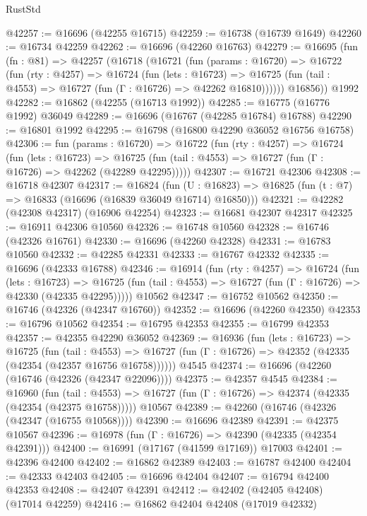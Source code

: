 \begin{lexlean}{RustStd}
\begin{coremodule}
@42257 := @16696 (@42255 @16715)
@42259 := @16738 (@16739 @1649)
@42260 := @16734 @42259
@42262 := @16696 (@42260 @16763)
@42279 := @16695
    (fun (fn : @81) =>
    @42257
      (@16718
        (@16721
          (fun (params : @16720) =>
          @16722
            (fun (rty : @4257) =>
            @16724
              (fun (lets : @16723) =>
              @16725 (fun (tail : @4553) => @16727 (fun (Γ : @16726) => @42262 @16810))))))
        @16856))
    @1992
@42282 := @16862 (@42255 (@16713 @1992))
@42285 := @16775 (@16776 @1992) @36049
@42289 := @16696 (@16767 (@42285 @16784) @16788)
@42290 := @16801 @1992
@42295 := @16798 (@16800 @42290 @36052 @16756 @16758)
@42306 := fun (params : @16720) =>
  @16722
    (fun (rty : @4257) =>
    @16724
      (fun (lets : @16723) =>
      @16725 (fun (tail : @4553) => @16727 (fun (Γ : @16726) => @42262 (@42289 @42295)))))
@42307 := @16721 @42306
@42308 := @16718 @42307
@42317 := @16824
    (fun (U : @16823) => @16825 (fun (t : @7) => @16833 (@16696 (@16839 @36049 @16714) @16850)))
@42321 := @42282 (@42308 @42317) (@16906 @42254)
@42323 := @16681 @42307 @42317
@42325 := @16911 @42306 @10560
@42326 := @16748 @10560
@42328 := @16746 (@42326 @16761)
@42330 := @16696 (@42260 @42328)
@42331 := @16783 @10560
@42332 := @42285 @42331
@42333 := @16767 @42332
@42335 := @16696 (@42333 @16788)
@42346 := @16914
    (fun (rty : @4257) =>
    @16724
      (fun (lets : @16723) =>
      @16725 (fun (tail : @4553) => @16727 (fun (Γ : @16726) => @42330 (@42335 @42295)))))
    @10562
@42347 := @16752 @10562
@42350 := @16746 (@42326 (@42347 @16760))
@42352 := @16696 (@42260 @42350)
@42353 := @16796 @10562
@42354 := @16795 @42353
@42355 := @16799 @42353
@42357 := @42355 @42290 @36052
@42369 := @16936
    (fun (lets : @16723) =>
    @16725
      (fun (tail : @4553) =>
      @16727 (fun (Γ : @16726) => @42352 (@42335 (@42354 (@42357 @16756 @16758))))))
    @4545
@42374 := @16696 (@42260 (@16746 (@42326 (@42347 @22096))))
@42375 := @42357 @4545
@42384 := @16960
    (fun (tail : @4553) => @16727 (fun (Γ : @16726) => @42374 (@42335 (@42354 (@42375 @16758)))))
    @10567
@42389 := @42260 (@16746 (@42326 (@42347 (@16755 @10568))))
@42390 := @16696 @42389
@42391 := @42375 @10567
@42396 := @16978 (fun (Γ : @16726) => @42390 (@42335 (@42354 @42391)))
@42400 := @16991 (@17167 (@41599 @17169)) @17003
@42401 := @42396 @42400
@42402 := @16862 @42389
@42403 := @16787 @42400
@42404 := @42333 @42403
@42405 := @16696 @42404
@42407 := @16794 @42400 @42353
@42408 := @42407 @42391
@42412 := @42402 (@42405 @42408) (@17014 @42259)
@42416 := @16862 @42404 @42408 (@17019 @42332)

\end{coremodule}
\end{lexlean}
